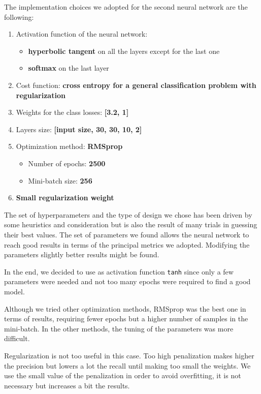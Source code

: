 \documentclass{Configuration_Files/PoliMi3i_thesis}
\begin{document}
The implementation choices we adopted for the second neural network are the following:
\begin{enumerate}
    \item Activation function of the neural network: 
    \begin{itemize}
        \item\textbf{hyperbolic tangent} on all the layers except for the last one
        \item\textbf{softmax} on the last layer
    \end{itemize}
    \item Cost function: \textbf{cross entropy for a general classification problem with regularization}
    \item Weights for the class losses: \textbf{[3.2, 1]}
    \item Layers size: \textbf{[input size, 30, 30, 10, 2]}
    \item Optimization method: \textbf{RMSprop}
        \begin{itemize}
        \item Number of epochs: \textbf{2500}
        \item Mini-batch size: \textbf{256}
    \end{itemize}
    \item \textbf{Small regularization weight}
\end{enumerate}

The set of hyperparameters and the type of design we chose has been driven by some heuristics and consideration but is also the result of many trials in guessing their best values. The set of parameters we found allows the neural network to reach good results in terms of the principal metrics we adopted. Modifying the parameters slightly better results might be found.

In the end, we decided to use as activation function \verb|tanh| since only a few parameters were needed and not too many epochs were required to find a good model.

Although we tried other optimization methods, RMSprop was the best one in terms of results, requiring fewer epochs but a higher number of samples in the mini-batch. In the other methods, the tuning of the parameters was more difficult.

Regularization is not too useful in this case. Too high penalization makes higher the precision but lowers a lot the recall until making too small the weights.
We use the small value of the penalization in order to avoid overfitting, it is not necessary but increases a bit the results.
\end{document}
